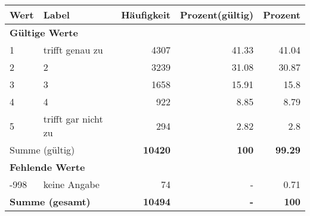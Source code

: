      \begin{longtable}{lXrrr}
     \toprule
     \textbf{Wert} & \textbf{Label} & \textbf{Häufigkeit} & \textbf{Prozent(gültig)} & \textbf{Prozent} \\
     \endhead
     \midrule
     \multicolumn{5}{l}{\textbf{Gültige Werte}}\\

     1 &
     \multicolumn{1}{X}{ trifft genau zu   } &


       \num{4307} &
       \num[round-mode=places,round-precision=2]{41,33} &
         \num[round-mode=places,round-precision=2]{41,04} \\

     2 &
     \multicolumn{1}{X}{ 2   } &


       \num{3239} &
       \num[round-mode=places,round-precision=2]{31,08} &
         \num[round-mode=places,round-precision=2]{30,87} \\

     3 &
     \multicolumn{1}{X}{ 3   } &


       \num{1658} &
       \num[round-mode=places,round-precision=2]{15,91} &
         \num[round-mode=places,round-precision=2]{15,8} \\

     4 &
     \multicolumn{1}{X}{ 4   } &


       \num{922} &
       \num[round-mode=places,round-precision=2]{8,85} &
         \num[round-mode=places,round-precision=2]{8,79} \\

     5 &
     \multicolumn{1}{X}{ trifft gar nicht zu   } &


       \num{294} &
       \num[round-mode=places,round-precision=2]{2,82} &
         \num[round-mode=places,round-precision=2]{2,8} \\
     \midrule
     \multicolumn{2}{l}{Summe (gültig)} &
       \textbf{\num{10420}} &
     \textbf{100} &
       \textbf{\num[round-mode=places,round-precision=2]{99,29}} \\
     \multicolumn{5}{l}{\textbf{Fehlende Werte}}\\
       -998 &
       keine Angabe &
         \num{74} &
        - &
         \num[round-mode=places,round-precision=2]{0,71} \\
     \midrule
     \multicolumn{2}{l}{\textbf{Summe (gesamt)}} &
          \textbf{\num{10494}} &
        \textbf{-} &
        \textbf{100} \\
     \bottomrule
     \end{longtable}
     
